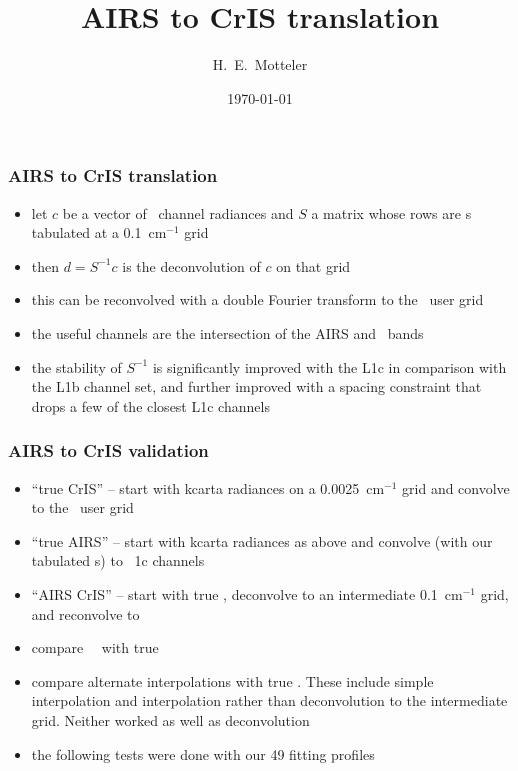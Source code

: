 \documentclass[11pt]{beamer}
\title{AIRS to CrIS translation}
\author{H.~E.~Motteler}
\institute{
  UMBC Atmospheric Spectroscopy Lab \\
  Joint Center for Earth Systems Technology \\
}
\date{\today}
\begin{document}
\begin{frame}[plain]
\titlepage
\end{frame}
\begin{frame}
\frametitle{AIRS to CrIS translation}

\begin{itemize}
  \item let $c$ be a vector of \airs\ channel radiances and $S$ a
    matrix whose rows are {\airs} {\srf}s tabulated at a 0.1~cm$^{-1}$
    grid

  \item then $d = S^{-1}c$ is the deconvolution of $c$ on that grid

  \item this can be reconvolved with a double Fourier transform
    to the \cris\ user grid

  \item the useful channels are the intersection of the AIRS and
    \cris\ bands

  \item the stability of $S^{-1}$ is significantly improved with the
    L1c in comparison with the L1b channel set, and further improved
    with a spacing constraint that drops a few of the closest L1c
    channels

\end{itemize}

\end{frame}
\begin{frame}
\frametitle{AIRS to CrIS validation}

\begin{itemize}
  \item ``true CrIS'' -- start with kcarta radiances on a
    0.0025~cm$^{-1}$ grid and convolve to the \cris\ user grid

  \item ``true AIRS'' -- start with kcarta radiances as above and
    convolve (with our tabulated {\srf}s) to \airs\ 1c channels

  \item ``AIRS CrIS'' -- start with true \airs, deconvolve to an
    intermediate 0.1~cm$^{-1}$ grid, and reconvolve to \cris
    
  \item compare \airs\ \cris\ with true \cris

  \item compare alternate interpolations with true \cris.  These
    include simple interpolation and interpolation rather than
    deconvolution to the intermediate grid.  Neither worked as well
    as deconvolution

  \item the following tests were done with our 49 fitting profiles

\end{itemize}

\end{frame}
\end{document}
